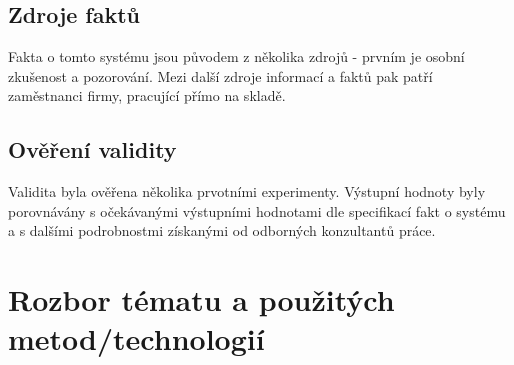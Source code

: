 \documentclass[11pt]{article}
\begin{document}
	\subsection{Zdroje faktů}
	Fakta o tomto systému jsou původem z několika zdrojů - prvním je osobní zkušenost a pozorování.
	Mezi další zdroje informací a faktů pak patří zaměstnanci firmy, pracující přímo na skladě.


	\subsection{Ověření validity}
	Validita byla ověřena několika prvotními experimenty.
	Výstupní hodnoty byly porovnávány s očekávanými výstupními hodnotami dle specifikací fakt o systému a s dalšími podrobnostmi získanými od odborných konzultantů práce.

	\newpage
	\section{Rozbor tématu a použitých metod/technologií} \label{sec:rozbor}
\end{document}
